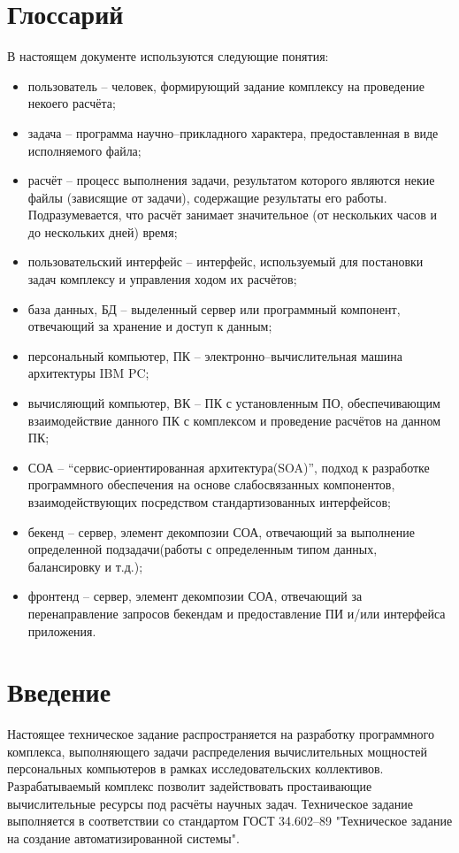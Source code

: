 \documentclass[a4paper,12pt]{report}
\date{\today}
\numberwithin{equation}{section}
\begin{document}
\section{Глоссарий}
В настоящем документе используются следующие понятия:
\begin{itemize}
  \item пользователь -- человек, формирующий задание комплексу на проведение некоего расчёта;
  \item задача -- программа научно--прикладного характера, предоставленная в виде исполняемого файла;
  \item расчёт -- процесс выполнения задачи, результатом которого являются некие файлы (зависящие от задачи), содержащие результаты его работы. Подразумевается, что расчёт занимает значительное (от нескольких часов и до нескольких дней) время;
  \item пользовательский интерфейс -- интерфейс, используемый для постановки задач комплексу и управления ходом их расчётов;
  \item база данных, БД -- выделенный сервер или программный компонент, отвечающий за хранение и доступ к данным;
  \item персональный компьютер, ПК -- электронно--вычислительная машина архитектуры IBM PC;
  \item вычисляющий компьютер, ВК -- ПК с установленным ПО, обеспечивающим взаимодействие данного ПК с комплексом и проведение расчётов на данном ПК;
  \item СОА -- ``сервис-ориентированная архитектура(SOA)'', подход к разработке программного обеспечения на основе слабосвязанных компонентов, взаимодействующих посредством стандартизованных интерфейсов;
  \item бекенд -- сервер, элемент декомпозии СОА, отвечающий за выполнение определенной подзадачи(работы с определенным типом данных, балансировку и т.д.);
  \item фронтенд -- сервер, элемент декомпозии СОА, отвечающий за перенаправление запросов бекендам и предоставление ПИ и/или интерфейса приложения.
\end{itemize}

\section{Введение}

Настоящее техническое задание распространяется на разработку программного комплекса, выполняющего задачи распределения вычислительных мощностей персональных компьютеров в рамках исследовательских коллективов. Разрабатываемый комплекс позволит задействовать простаивающие вычислительные ресурсы под расчёты научных задач. Техническое задание выполняется в соответствии со стандартом ГОСТ 34.602--89 "Техническое задание на создание автоматизированной системы".
\end{document}
